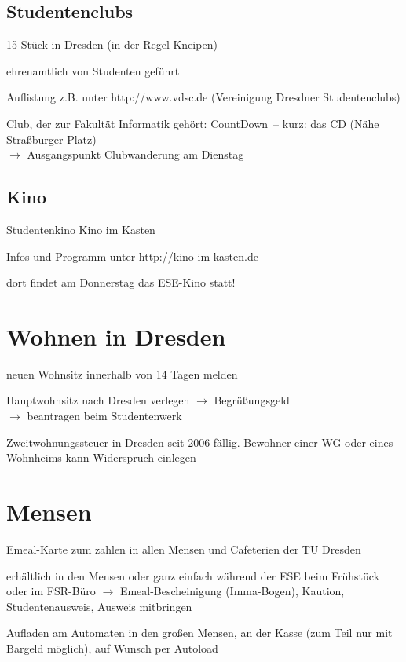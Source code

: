 \documentclass[a4paper,12pt]{report}
\begin{document}
\subsection{Studentenclubs}
\begin{itemize*}
	\item 15 Stück in Dresden (in der Regel Kneipen)
	\item ehrenamtlich von Studenten geführt
	\item  Auflistung z.B. unter http://www.vdsc.de (Vereinigung Dresdner Studentenclubs)
	\item Club, der zur Fakultät Informatik gehört: \glqq CountDown\grqq\ -- kurz: das CD (Nähe Straßburger Platz)\\
	$\rightarrow$ Ausgangspunkt Clubwanderung am Dienstag
\end{itemize*}

\subsection{Kino}
\begin{itemize*}
	\item Studentenkino \glqq Kino im Kasten\grqq
	\item Infos und Programm unter http://kino-im-kasten.de
	\item dort findet am Donnerstag das ESE-Kino statt!
\end{itemize*}


\section{Wohnen in Dresden}
\begin{itemize*}

	\item neuen Wohnsitz innerhalb von 14 Tagen melden
  	\item Hauptwohnsitz nach Dresden verlegen $\rightarrow$  \glqq Begrüßungsgeld\grqq\\
  $\rightarrow$ beantragen beim Studentenwerk
  \item Zweitwohnungssteuer in Dresden seit 2006 fällig. Bewohner einer WG oder eines Wohnheims kann Widerspruch einlegen
\end{itemize*}

\section{Mensen}
\begin{itemize*}
	\item Emeal-Karte zum zahlen in allen Mensen und Cafeterien der TU Dresden
	\item erhältlich in den Mensen oder ganz einfach während der ESE beim Frühstück oder im FSR-Büro
	$\rightarrow$ Emeal-Bescheinigung (Imma-Bogen),  Kaution, Studentenausweis, Ausweis mitbringen
	\item Aufladen am Automaten in den großen Mensen, an der Kasse (zum Teil nur mit Bargeld möglich), auf Wunsch per Autoload
\end{itemize*}
\end{document}

